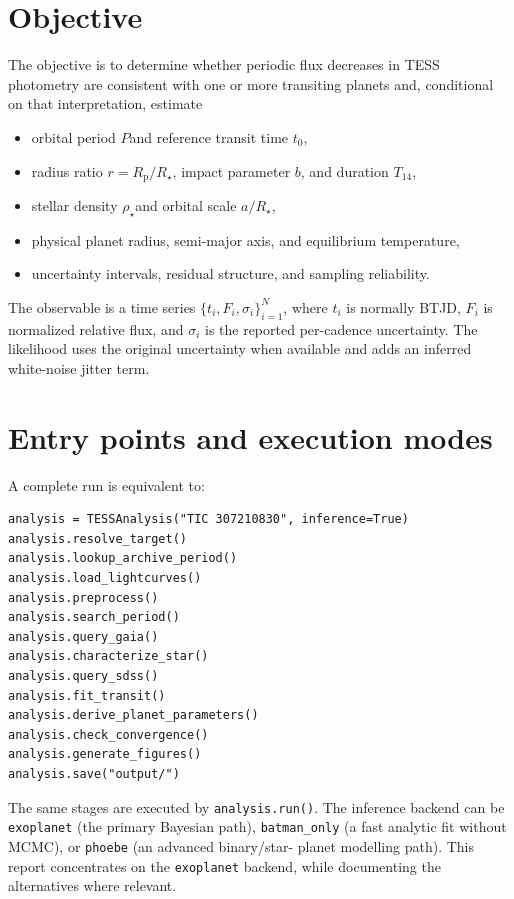 \documentclass[12pt,a4paper,oneside]{report}
\newcommand{\Rstar}{\ensuremath{R_{\star}}}
\newcommand{\rhoStar}{\ensuremath{\rho_{\star}}}
\newcommand{\Rp}{\ensuremath{R_{\mathrm{p}}}}
\newcommand{\Porb}{\ensuremath{P}}
\newcommand{\Tfourteen}{\ensuremath{T_{14}}}
\newcommand{\tzero}{\ensuremath{t_{0}}}
\newcommand{\code}[1]{\texttt{\small #1}}
\begin{document}
\section{Objective}
The objective is to determine whether periodic flux decreases in TESS
photometry are consistent with one or more transiting planets and, conditional
on that interpretation, estimate
\begin{itemize}
  \item orbital period \Porb and reference transit time \tzero,
  \item radius ratio \(r=\Rp/\Rstar\), impact parameter \(b\), and duration \Tfourteen,
  \item stellar density \rhoStar and orbital scale \(a/\Rstar\),
  \item physical planet radius, semi-major axis, and equilibrium temperature,
  \item uncertainty intervals, residual structure, and sampling reliability.
\end{itemize}
The observable is a time series \(\{t_i,F_i,\sigma_i\}_{i=1}^{N}\), where
\(t_i\) is normally BTJD, \(F_i\) is normalized relative flux, and \(\sigma_i\)
is the reported per-cadence uncertainty. The likelihood uses the original
uncertainty when available and adds an inferred white-noise jitter term.

\section{Entry points and execution modes}
A complete run is equivalent to:
\begin{lstlisting}
analysis = TESSAnalysis("TIC 307210830", inference=True)
analysis.resolve_target()
analysis.lookup_archive_period()
analysis.load_lightcurves()
analysis.preprocess()
analysis.search_period()
analysis.query_gaia()
analysis.characterize_star()
analysis.query_sdss()
analysis.fit_transit()
analysis.derive_planet_parameters()
analysis.check_convergence()
analysis.generate_figures()
analysis.save("output/")
\end{lstlisting}
The same stages are executed by \code{analysis.run()}. The inference backend
can be \code{exoplanet} (the primary Bayesian path), \code{batman\_only} (a
fast analytic fit without MCMC), or \code{phoebe} (an advanced binary/star-
planet modelling path). This report concentrates on the \code{exoplanet}
backend, while documenting the alternatives where relevant.
\end{document}
